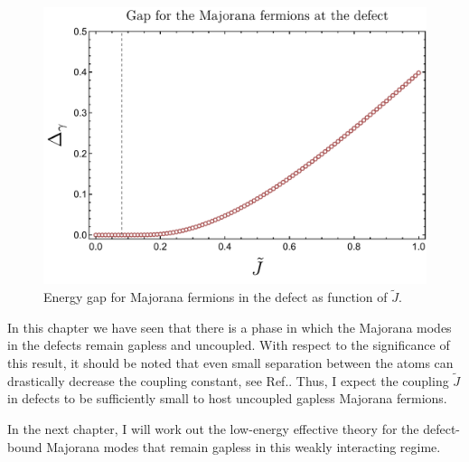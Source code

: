 \begin{figure}
    \centering
    \includegraphics[width=.6\textwidth]{images/CH4/gap_no_fit.pdf}
        \caption{Energy gap for Majorana fermions in the defect as function of $\tilde{J}$.}
        \label{fig:4-gap}
\end{figure}


In this chapter we have seen that there is a phase in which the Majorana modes in the defects remain gapless and uncoupled. With respect to the significance of this result, it should be noted that even small separation between the atoms can drastically decrease the coupling constant, see Ref.\cite{Yadav_2018}. Thus, I expect the coupling $\tilde{J}$ in defects to be sufficiently small to host uncoupled gapless Majorana fermions.

In the next chapter, I will work out the low-energy effective theory for the defect-bound Majorana modes that remain gapless in this weakly interacting regime.












